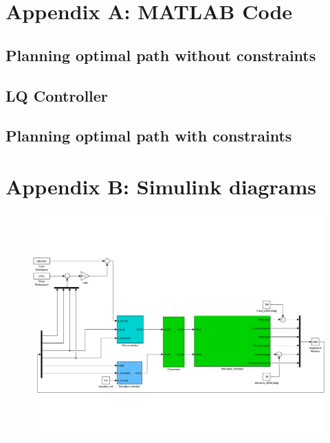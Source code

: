 


\begin{appendices}

\section{Appendix A: MATLAB Code}

\label{appendix:A}



\subsection{Planning optimal path without constraints}





\subsection{LQ Controller}





\subsection{Planning optimal path with constraints}









\section{Appendix B: Simulink diagrams}

\label{appendix:B}



\begin{figure}[h]

    \includegraphics[width=\textwidth]{ex3sim.pdf}


\end{figure}
\end{appendices}
